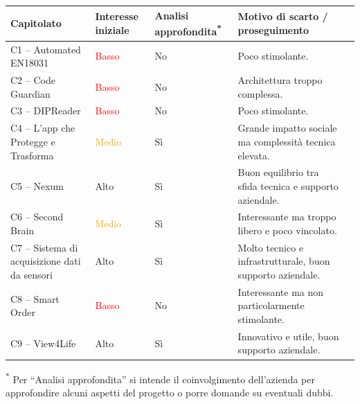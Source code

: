 \documentclass[a4paper,11pt]{article}
\begin{document}
{\footnotesize
\begin{tabularx}{\textwidth}{
|>{\raggedright\arraybackslash}p{1.6cm}|
>{\raggedright\arraybackslash}p{2.3cm}|
>{\raggedright\arraybackslash}p{2cm}|
X|
>{\raggedright\arraybackslash}p{2.3cm}|}
\hline
\rowcolor{primaryblue!40}
\textbf{\color{white} Capitolato} &
\textbf{\color{white} Interesse iniziale} &
\textbf{\color{white} Analisi approfondita\textsuperscript{*}} &
\textbf{\color{white} Motivo di scarto / proseguimento} \\
\hline

\rowcolor{secondaryblue!10}
C1 – Automated EN18031 & \textcolor{red}{Basso} & No &
Poco stimolante. \\
\hline

\rowcolor{secondaryblue!10}
C2 – Code Guardian & \textcolor{red}{Basso} & No &
Architettura troppo complessa. \\
\hline

\rowcolor{secondaryblue!10}
C3 – DIPReader & \textcolor{red}{Basso} & No &
Poco stimolante. \\
\hline

\rowcolor{secondaryblue!10}
C4 – L'app che Protegge e Trasforma & \textcolor{orange}{Medio} & Sì &
Grande impatto sociale ma complessità tecnica elevata. \\
\hline

\rowcolor{secondaryblue!10}
C5 – Nexum & \textcolor{green!60!black}{Alto} & Sì &
Buon equilibrio tra sfida tecnica e supporto aziendale. \\
\hline

\rowcolor{secondaryblue!10}
C6 – Second Brain & \textcolor{orange}{Medio} & Sì &
Interessante ma troppo libero e poco vincolato. \\
\hline

\rowcolor{secondaryblue!10}
C7 – Sistema di acquisizione dati da sensori & \textcolor{green!60!black}{Alto} & Sì &
Molto tecnico e infrastrutturale, buon supporto aziendale. \\
\hline

\rowcolor{secondaryblue!10}
C8 – Smart Order & \textcolor{red}{Basso} & No &
Interessante ma non particolarmente stimolante. \\
\hline

\rowcolor{secondaryblue!10}
C9 – View4Life & \textcolor{green!60!black}{Alto} & Sì &
Innovativo e utile, buon supporto aziendale. \\
\hline
\end{tabularx}
}

\textsuperscript{*} Per ``Analisi approfondita'' si intende il coinvolgimento dell'azienda per approfondire alcuni aspetti del progetto o porre domande su eventuali dubbi.
\end{document}
